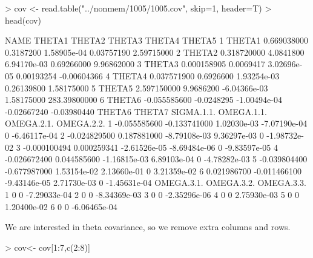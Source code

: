 \begin{Schunk}
\begin{Sinput}
> cov <- read.table("../nonmem/1005/1005.cov", skip=1, header=T)
> head(cov)
\end{Sinput}
\begin{Soutput}
    NAME       THETA1     THETA2       THETA3      THETA4       THETA5
1 THETA1  0.669038000  0.3187200  1.58905e-04  0.03757190   2.59715000
2 THETA2  0.318720000  4.0841800  6.94170e-03  0.69266000   9.96862000
3 THETA3  0.000158905  0.0069417  3.02696e-05  0.00193254  -0.00604366
4 THETA4  0.037571900  0.6926600  1.93254e-03  0.26139800   1.58175000
5 THETA5  2.597150000  9.9686200 -6.04366e-03  1.58175000 283.39800000
6 THETA6 -0.055585600 -0.0248295 -1.00494e-04 -0.02667240  -0.03980440
        THETA6       THETA7   SIGMA.1.1.   OMEGA.1.1. OMEGA.2.1.   OMEGA.2.2.
1 -0.055585600 -0.133741000  1.02030e-03 -7.07190e-04          0 -6.46117e-04
2 -0.024829500  0.187881000 -8.79108e-03  9.36297e-03          0 -1.98732e-02
3 -0.000100494  0.000259341 -2.61526e-05 -8.69484e-06          0 -9.83597e-05
4 -0.026672400  0.044585600 -1.16815e-03  6.89103e-04          0 -4.78282e-03
5 -0.039804400 -0.677987000  1.53154e-02  2.13660e-01          0  3.21359e-02
6  0.021986700 -0.011466100 -9.43146e-05  2.71730e-03          0 -1.45631e-04
  OMEGA.3.1. OMEGA.3.2.   OMEGA.3.3.
1          0          0 -7.29033e-04
2          0          0 -8.34369e-03
3          0          0 -2.35296e-06
4          0          0  2.75930e-03
5          0          0  1.20400e-02
6          0          0 -6.06465e-04
\end{Soutput}
\end{Schunk}
We are interested in theta covariance, so we remove extra columns and rows.
\begin{Schunk}
\begin{Sinput}
> cov<- cov[1:7,c(2:8)]
\end{Sinput}
\end{Schunk}
